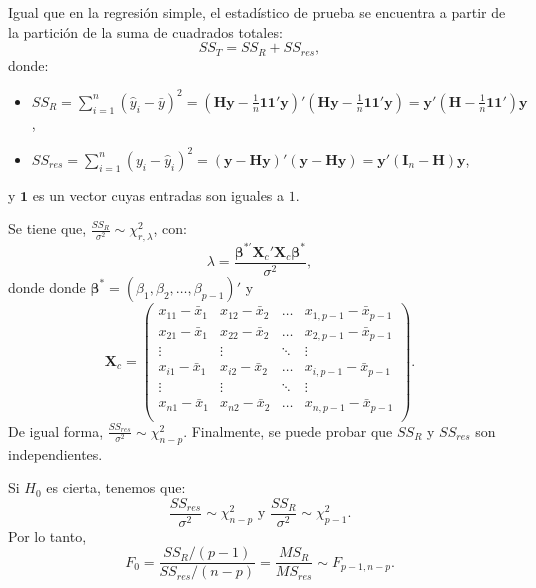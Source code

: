 \documentclass[
]{article}
\providecommand{\tightlist}{%
  \setlength{\itemsep}{0pt}\setlength{\parskip}{0pt}}
\begin{document}
Igual que en la regresión simple, el estadístico de prueba se encuentra a partir de la partición de la suma de cuadrados totales:
\[
SS_{T}  = SS_{R} + SS_{res},
\]
donde:

\begin{itemize}
\tightlist
\item
  \(SS_{R} = \sum_{i=1}^{n}(\widehat{y}_{i}-\bar{y})^{2} = (\boldsymbol H\boldsymbol y- \frac{1}{n}\boldsymbol 1\boldsymbol 1'\boldsymbol y)'(\boldsymbol H\boldsymbol y- \frac{1}{n}\boldsymbol 1\boldsymbol 1'\boldsymbol y)=\boldsymbol y'(\boldsymbol H- \frac{1}{n}\boldsymbol 1\boldsymbol 1')\boldsymbol y\),
\item
  \(SS_{res} = \sum_{i=1}^{n}(y_{i}-\widehat{y}_{i})^{2} = (\boldsymbol y- \boldsymbol H\boldsymbol y)'(\boldsymbol y- \boldsymbol H\boldsymbol y)=\boldsymbol y'(\boldsymbol I_n-\boldsymbol H)\boldsymbol y\),
\end{itemize}

y \(\boldsymbol 1\) es un vector cuyas entradas son iguales a \(1\).

Se tiene que, \(\frac{SS_{R}}{\sigma^2} \sim \chi^2_{r,\lambda}\), con:
\begin{equation}
\lambda = \frac{\boldsymbol \beta^{*'}\boldsymbol X_{c}'\boldsymbol X_{c}\boldsymbol \beta^{*}}{\sigma^{2}},
\label{eq:lambda}
\end{equation}
donde donde \(\boldsymbol \beta^{*} = (\beta_{1},\beta_{2},\ldots,\beta_{p-1})'\) y
\[
\boldsymbol X_{c} = \begin{pmatrix}
x_{11} - \bar{x}_{1} & x_{12} - \bar{x}_{2} & \ldots & x_{1,p-1} - \bar{x}_{p-1} \\ 
x_{21} - \bar{x}_{1} & x_{22} - \bar{x}_{2} & \ldots & x_{2,p-1} - \bar{x}_{p-1} \\ 
\vdots & \vdots & \ddots & \vdots \\
x_{i1} - \bar{x}_{1} & x_{i2} - \bar{x}_{2} & \ldots & x_{i,p-1} - \bar{x}_{p-1} \\ 
\vdots & \vdots & \ddots & \vdots \\
x_{n1} - \bar{x}_{1} & x_{n2} - \bar{x}_{2} & \ldots & x_{n,p-1} - \bar{x}_{p-1} \\ 
\end{pmatrix}.
\]
De igual forma, \(\frac{SS_{res}}{\sigma^2} \sim \chi^2_{n-p}\). Finalmente, se puede probar que \(SS_{R}\) y \(SS_{res}\) son independientes.

Si \(H_{0}\) es cierta, tenemos que:
\[
\frac{SS_{res}}{\sigma^{2}}\sim\chi^{2}_{n-p} \mbox{ y } \frac{SS_{R}}{\sigma^{2}} \sim \chi^{2}_{p-1}.
\]
Por lo tanto,
\[
F_{0} = \frac{SS_{R}/(p-1)}{SS_{res}/(n-p)} = \frac{MS_{R}}{MS_{res}} \sim F_{p-1,n-p}.
\]
\end{document}
